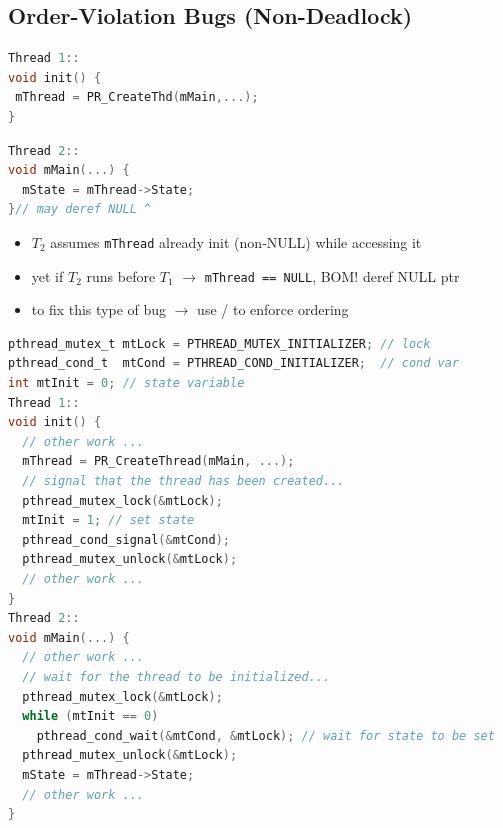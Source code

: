 \documentclass[8pt,a4paper,landscape]{extarticle}
\begin{document}
\begin{multicols*}{3}
\section*{Order-Violation Bugs (Non-Deadlock)}
\begin{minipage}{0.5\linewidth}
\begin{lstlisting}[language=c]
Thread 1::
void init() {
 mThread = PR_CreateThd(mMain,...);
}
\end{lstlisting}
\end{minipage}
\begin{minipage}{0.5\linewidth}
\begin{lstlisting}[language=c,xleftmargin=4pt]
Thread 2::
void mMain(...) {
  mState = mThread->State;
}// may deref NULL ^
\end{lstlisting}
\end{minipage}
\begin{itemize}
\item $T_2$ assumes \texttt{mThread} already init (non-NULL) while accessing it
\item yet if $T_2$ runs before $T_1$ $\to$ \texttt{mThread == NULL}, BOM! deref NULL ptr
\item to fix this type of bug $\to$ use / to enforce ordering
\end{itemize}
\begin{lstlisting}[language=c]
pthread_mutex_t mtLock = PTHREAD_MUTEX_INITIALIZER; // lock
pthread_cond_t  mtCond = PTHREAD_COND_INITIALIZER;  // cond var
int mtInit = 0; // state variable
Thread 1::
void init() {
  // other work ...
  mThread = PR_CreateThread(mMain, ...);
  // signal that the thread has been created...
  pthread_mutex_lock(&mtLock);
  mtInit = 1; // set state
  pthread_cond_signal(&mtCond);
  pthread_mutex_unlock(&mtLock);
  // other work ...
}
Thread 2::
void mMain(...) {
  // other work ...
  // wait for the thread to be initialized...
  pthread_mutex_lock(&mtLock);
  while (mtInit == 0)
    pthread_cond_wait(&mtCond, &mtLock); // wait for state to be set
  pthread_mutex_unlock(&mtLock);
  mState = mThread->State;
  // other work ...
}
\end{lstlisting}
\begin{minipage}{0.5\linewidth}

\end{minipage}
\end{multicols*}
\end{document}

